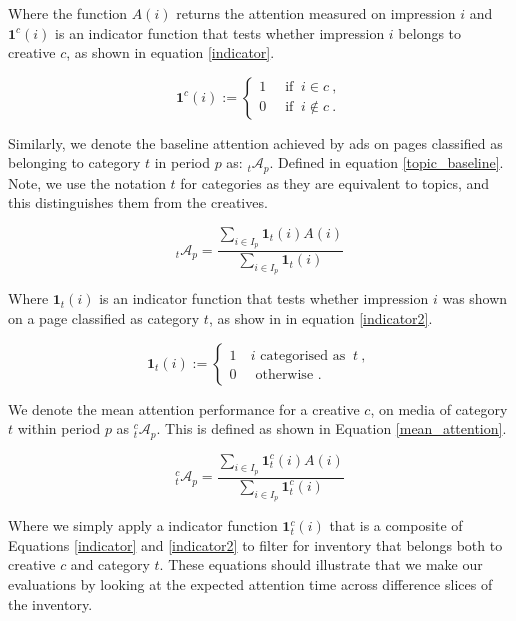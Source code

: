 \documentclass[sigconf]{acmart}
\begin{document}
Where the function $A(i)$ returns the attention measured on impression $i$ and
$\mathbf{1}^c(i)$ is an indicator function that
tests whether impression $i$ belongs to creative $c$, as shown in equation \ref{indicator}.

\begin{equation}
\label{indicator}
  \mathbf{1}^{c}(i):=
  \begin{cases}1~&{\text{ if }}~i\in c~,\\0~&{\text{ if }}~i\notin c~.\end{cases}
\end{equation}

Similarly, we denote the baseline attention achieved by ads on pages classified
as belonging to category $t$ in period $p$ as: ${}_t\mathcal{A}_p$. Defined in
equation \ref{topic_baseline}. Note, we use the notation $t$ for categories as they
are equivalent to topics, and this distinguishes them from the creatives.


\begin{equation}
\label{topic_baseline}
{}_t\mathcal{A}_p =  \frac{ \sum_{i \in I_p} \mathbf{1}_t(i) A(i) }{ \sum_{i \in I_p} \mathbf{1}_t(i) }
\end{equation}

Where $\mathbf{1}_t(i)$ is an indicator function that
tests whether impression $i$ was shown on a page classified as category $t$,
as show in in equation \ref{indicator2}.

\begin{equation}
\label{indicator2}
  \mathbf{1}_{t}(i):=
  \begin{cases}1~&{ i\text{ categorised as }}~t~,\\0~&{\text{ otherwise }}.\end{cases}
\end{equation}

We denote the mean attention performance for a creative $c$, on media of category $t$
within period $p$ as ${}^c_t\mathcal{A}_p$.
This is defined as shown in Equation \ref{mean_attention}.

\begin{equation}
\label{mean_attention}
{}^c_t\mathcal{A}_p =  \frac{ \sum_{i \in I_p} \mathbf{1}^c_t(i) A(i) }{ \sum_{i \in I_p} \mathbf{1}^c_t(i) }
\end{equation}

Where we simply apply a indicator function $\mathbf{1}^c_t(i)$ that is a composite
of Equations \ref{indicator} and \ref{indicator2} to filter for inventory that
belongs both to creative $c$ and category $t$. These equations should illustrate that we
make our evaluations by looking at the expected attention time across difference slices
of the inventory.
\end{document}
